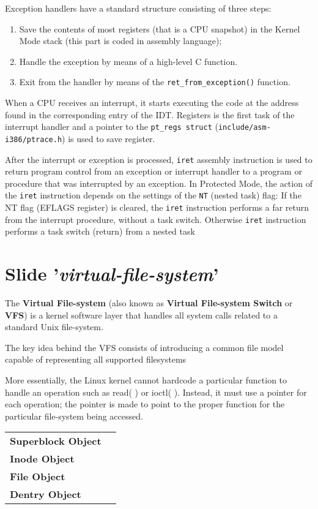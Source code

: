 \documentclass[10pt,a4paper]{article}
\begin{document}
Exception handlers have a standard structure consisting of three steps:
\begin{enumerate}
\item Save the contents of most registers (that is a CPU snapshot) in the Kernel Mode stack (this part is coded in assembly language);
\item Handle the exception by means of a high-level C function.
\item Exit from the handler by means of the \texttt{ret\_from\_exception()} function.
\end{enumerate}

When a CPU receives an interrupt, it starts executing the code at the address found in the corresponding entry of the IDT. Registers is the first task of the interrupt handler and a pointer to the \texttt{pt\_regs struct} (\texttt{include/asm-i386/ptrace.h}) is used to save register.

After the interrupt or exception is processed, \texttt{iret} assembly instruction is used to return program control from an exception or interrupt handler to a program or procedure that was interrupted by an exception. In Protected Mode, the action of the \texttt{iret} instruction depends on the settings of the \texttt{NT} (nested task) flag:
If the NT flag (EFLAGS register) is cleared, the \texttt{iret} instruction performs a far return from the interrupt procedure, without a task switch. Otherwise \texttt{iret} instruction performs a task switch (return) from a nested task

\newpage
\section{Slide '\textit{virtual-file-system}'}

The \textbf{Virtual File-system} (also known as \textbf{Virtual File-system Switch} or \textbf{VFS}) is a kernel software layer that handles all system calls related to a standard Unix file-system. 


The key idea behind the VFS consists of introducing a common file model capable of representing all supported filesystems

More essentially, the Linux kernel cannot hardcode a particular function to handle an operation such as read( ) or ioctl( ). Instead, it must use a pointer for each operation; the pointer is made to point to the proper function for the particular file-system being accessed.


\begin{center}
\begin{tabular}{lr} 
\toprule
 
\textbf{Superblock Object} &  \\ 

\textbf{Inode Object} & \\

\textbf{File Object} & \\

\textbf{Dentry Object} & \\


\bottomrule
\end{tabular}
\end{center}
\end{document}
